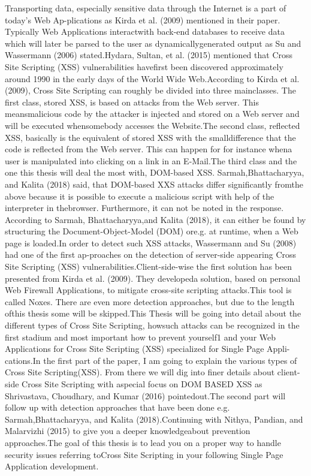 Transporting data, especially sensitive data through the Internet is a part of today’s Web Ap-plications as Kirda et al. (2009) mentioned in their paper.  Typically Web Applications interactwith back-end databases to receive data which will later be parsed to the user as dynamicallygenerated output as Su and Wassermann (2006) stated.Hydara, Sultan, et al. (2015) mentioned that Cross Site Scripting (XSS) vulnerabilities havefirst been discovered approximately around 1990 in the early days of the World Wide Web.According to Kirda et al. (2009), Cross Site Scripting can roughly be divided into three mainclasses.   The  first  class,  stored  XSS,  is  based  on  attacks  from  the  Web  server.   This  meansmalicious code by the attacker is injected and stored on a Web server and will be executed whensomebody accesses the Website.The second class, reflected XSS, basically is the equivalent of stored XSS with the smalldifference that the code is reflected from the Web server. This can happen for for instance whena user is manipulated into clicking on a link in an E-Mail.The third class and the one this thesis will deal the most with, DOM-based XSS. Sarmah,Bhattacharyya, and Kalita (2018) said, that DOM-based XXS attacks differ significantly fromthe above because it is possible to execute a malicious script with help of the interpreter in thebrowser. Furthermore, it can not be noted in the response. According to Sarmah, Bhattacharyya,and Kalita (2018), it can either be found by structuring the Document-Object-Model (DOM) ore.g. at runtime, when a Web page is loaded.In order to detect such XSS attacks,  Wassermann and Su (2008) had one of the first ap-proaches on the detection of server-side appearing Cross Site Scripting (XSS) vulnerabilities.Client-side-wise the first solution has been presented from Kirda et al. (2009). They developeda solution, based on personal Web Firewall Applications, to mitigate cross-site scripting attacks.This tool is called Noxes.  There are even more detection approaches, but due to the length ofthis thesis some will be skipped.This Thesis will be going into detail about the different types of Cross Site Scripting, howsuch attacks can be recognized in the first stadium and most important how to prevent yourself1
and your Web Applications for Cross Site Scripting (XSS) specialized for Single Page Appli-cations.In the first part of the paper, I am going to explain the various types of Cross Site Scripting(XSS). From there we will dig into finer details about client-side Cross Site Scripting with aspecial focus on DOM BASED XSS as Shrivastava,  Choudhary,  and Kumar (2016) pointedout.The second part will follow up with detection approaches that have been done e.g. Sarmah,Bhattacharyya, and Kalita (2018).Continuing with Nithya, Pandian, and Malarvizhi (2015) to give you a deeper knowledgeabout prevention approaches.The goal of this thesis is to lead you on a proper way to handle security issues referring toCross Site Scripting in your following Single Page Application development.

